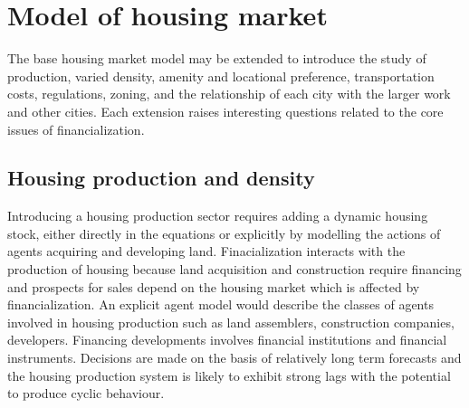 




\section{Model of housing market}

The base housing market model may be extended to introduce the study of production, varied density, amenity and locational preference, transportation costs, regulations, zoning, and the relationship of each city with the larger work and other cities. Each extension raises interesting questions related to the core issues of financialization.

\subsection{Housing production and density}


Introducing a housing production sector requires adding a dynamic housing stock, either directly in the equations or explicitly by modelling the actions of agents acquiring and developing land. %
Finacialization interacts with the production of housing because land acquisition and construction require financing and prospects for sales depend on the housing market which is affected by financialization. An explicit agent model would describe the classes of agents involved in housing production such as land assemblers, construction companies, developers. 
Financing developments involves financial institutions and financial instruments. Decisions are made on the basis of relatively long term forecasts and the housing production system is likely to exhibit strong lags with the potential to produce cyclic behaviour.


